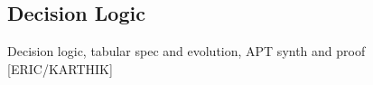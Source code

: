\subsection{Decision Logic}

Decision logic, tabular spec and evolution, APT synth and proof [ERIC/KARTHIK]
